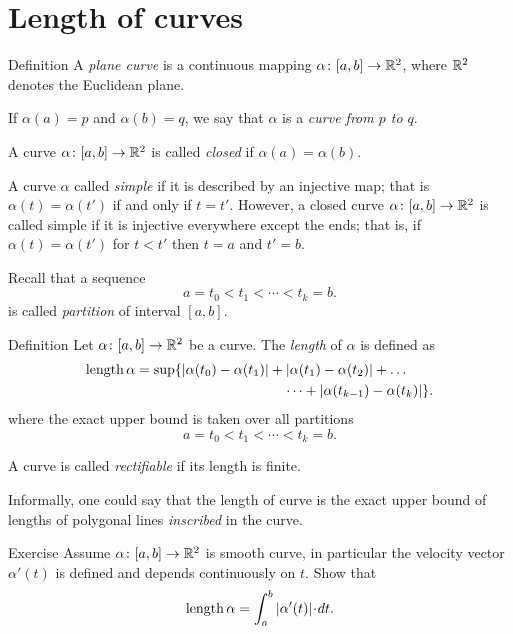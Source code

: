 \chapter{Length of curves}

\begin{thm}{Definition}\label{def:curve}
A \emph{plane curve} is a continuous mapping $\alpha\:[a,b]\z\to \RR^2$,
where $\mathbb{R}^2$ denotes the Euclidean plane. 

If $\alpha(a)=p$ and $\alpha(b)=q$,
we say that $\alpha$ is a \emph{curve from $p$ to $q$}.

A curve $\alpha\colon[a,b]\to \mathbb{R}^2$ is called \emph{closed} if $\alpha(a)=\alpha(b)$.

A curve $\alpha$ called \emph{simple} if it is described by an injective map;
that is $\alpha(t)=\alpha(t')$ if and only if $t=t'$.
However, a closed curve $\alpha\colon[a,b]\to \mathbb{R}^2$ is called simple if it is injective 
everywhere except the ends; that is, if
$\alpha(t)=\alpha(t')$ for $t<t'$ then $t=a$ and $t'=b$.
\end{thm}
 
Recall that a sequence 
\[a=t_0 < t_1 < \cdots < t_k=b.\]
is called \emph{partition} of interval $[a,b]$.

\begin{thm}{Definition}\label{def:length}
Let $\alpha\colon[a,b]\to \mathbb{R}^2$ be a curve.
The \emph{length} of $\alpha$ is defined as
\begin{align*}
\length \alpha
&= 
\sup \{|\alpha(t_0)-\alpha(t_1)|+|\alpha(t_1)-\alpha(t_2)|+\dots
\\
&\ \ \ \ \ \ \ \ \ \ \ \ \ \ \ \ \ \ \ \ \ \ \ \ \ \ \ \ \ \ \ \ \dots+|\alpha(t_{k-1})-\alpha(t_k)|\}. 
\end{align*}
where the exact upper bound is taken over all partitions
\[a=t_0 < t_1 < \cdots < t_k=b.\]

A curve is called \emph{rectifiable} if its length is finite.
\end{thm}

Informally, one could say that the length of curve is the exact upper bound of lengths of polygonal lines \emph{inscribed} in the curve.

\begin{thm}{Exercise}
Assume $\alpha\colon[a,b]\to\mathbb{R}^2$ is smooth curve, in particular the velocity vector $\alpha'(t)$ is defined and depends continuously on $t$.
Show that
\[\length \alpha=\int_a^b|\alpha'(t)|\cdot dt.\]
\end{thm}

